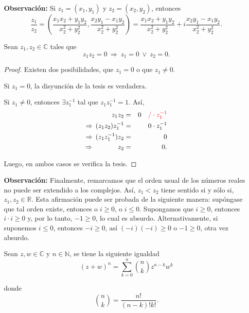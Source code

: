 \textbf{Observación:}  Si $z_1 = (x_1,y_1)$ y $z_2 = (x_2, y_2)$, entonces
\begin{equation*}
\frac{z_1}{z_2} = \left( \frac{x_1x_2 + y_1y_2}{x_2^2 + y_2^2}, \frac{x_2 y_1 - x_1y_2}{x_2^2 + y_2^2} \right) = \frac{x_1x_2 + y_1y_2}{x_2^2 + y_2^2} + i \frac{x_2 y_1 - x_1y_2}{x_2^2 + y_2^2}.
\end{equation*}

\begin{propo}
Sean $z_1, z_2 \in \mathbb{C}$ tales que
$$z_1 z_2 = 0 ~\Rightarrow~ z_1 = 0 ~\vee~ z_2 = 0.$$
\end{propo}

\begin{proof}

Existen dos posibilidades, que $z_1 =0$ o que $z_1 \neq 0$.

Si $z_1 = 0$, la disyunción de la tesis es verdadera.

Si $z_1 \neq 0$, entonces $\exists z_1^{-1}$ tal que $z_1 z_1^{-1} = 1$. Así,
\begin{eqnarray*}
z_1 z_2 &=& 0 \quad \color{red}{/ \cdot z_1^{-1}}\\
\Rightarrow \, (z_1 z_2) z_1^{-1} &=& 0 \cdot z_1^{-1} \\
\Rightarrow \, (z_1  z_1^{-1}) z_2 &=& 0 \\
\Rightarrow \qquad \quad ~ \,z_2 &=& 0.
\end{eqnarray*}

Luego, en ambos casos se verifica la tesis.

\end{proof}

\textbf{Observación:} Finalmente, remarcamos que el orden usual de los números reales no puede ser extendido a los complejos. Así, $z_1 < z_2$ tiene sentido si y sólo si, $z_1, z_2 \in \mathbb{R}$. Esta afirmación puede ser probada de la siguiente  manera: supóngase que tal orden existe, entonces o $i \geq 0$, o $i \leq 0$. Supongamos que $i \geq 0$, entonces $i \cdot i \geq 0$ y, por lo tanto, $-1 \geq 0$, lo cual es absurdo. Alternativamente, si suponemos $i \leq 0$, entonces $-i \geq 0$, así $(-i)(-i) \geq 0$ o $-1 \geq 0$, otra vez absurdo. 

\begin{teorema}
Sean $z, w \in \mathbb{C}$ y $n \in \mathbb{N}$, se tiene la siguiente igualdad
$$(z+w)^n = \sum_{k=0}^n {n \choose k} z^{n-k}w^k$$

donde $${n \choose k} = \frac{n!}{(n-k)! k!}.$$
\end{teorema}

